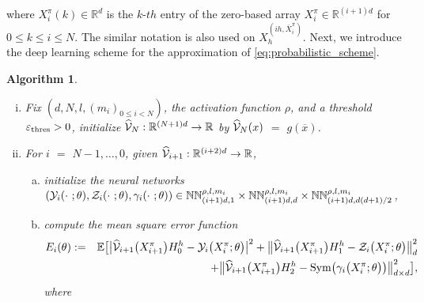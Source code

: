 \documentclass[12pt]{article}
\newtheorem{algo}[prop]{Algorithm}
\numberwithin{equation}{section}
\newcommand{\norm}[1]{\lVert#1\rVert}
\newcommand{\E}{\mathbb{E}}
\newcommand{\real}{\mathbb{R}}
\begin{document}
where $X^\pi_i (k) \in \real^d$ is the
 $k$-$th$ entry of the zero-based array $X^\pi_i \in \real^{(i+1)d}$
for $0 \leq k \leq i \leq N$.
The similar notation is also used on
$X^{(ih, \overline{X}^\pi_i )}_h$.
Next, we introduce the deep learning scheme
for the approximation of \eqref{eq:probabilistic_scheme}.
\begin{algo}
\label{algo:deep_ppde}
\begin{enumerate}[i)]
    \item Fix
        $(d,N,l,(m_i)_{0 \leq i < N })$,
        the activation function $\rho$,
        and a threshold $\varepsilon_{\rm thres}>0$,
        initialize $\widehat{\cal V}_N:\real^{(N+1)d} \to \real$
        by $\widehat{\cal V}_N(x)$ $=$ $g(\overline{x})$.
      \item For $i$ $=$ $N-1,\ldots,0$, given
          $\widehat{\cal V}_{i+1}:\real^{(i+2)d} \to \real$,
        \begin{enumerate}[a)]
          \item initialize the neural networks \\
              $\left({\cal Y}_i(\cdot \ ;\theta),
              {\cal Z}_i(\cdot \ ;\theta),
	      	  {\cal \gamma}_i(\cdot \ ;\theta)\right)
              \in \mathbb{NN}^{\rho,l,m_i}_{(i+1)d, 1}
              \times \mathbb{NN}^{\rho,l,m_i}_{(i+1)d, d}
              \times \mathbb{NN}^{\rho,l,m_i}_{(i+1)d, d(d+1)/2}$,
            \item
              compute the mean square error function
	      \begin{eqnarray}
                              \nonumber
                E_i(\theta) & := & \E \bigl[ \big\lvert \widehat{\cal V}_{i+1}\big(X^\pi_{i+1}\big) H_0^h - {\cal Y}_i\big(X^\pi_i ;\theta\big)\big\rvert^2
			      + \big\lVert \widehat{\cal V}_{i+1}\big(X^\pi_{i+1}\big)H_1^h - {\cal Z}_i\big(X^\pi_i ;\theta\big)\big\rVert_d^2
                              \\
                \label{eq:deep_scheme_nonlinear}
                              &  &
          + \big\lVert \widehat{\cal V}_{i+1}\big(X^\pi_{i+1}\big)H_2^h
      - {\rm Sym} \big( {\cal \gamma}_i\big(X^\pi_i ;\theta\big)\big) \big\rVert_{d\times d}^2\bigr],
              \end{eqnarray}
	      where

\end{enumerate}
\end{enumerate}
\end{algo}
\end{document}
